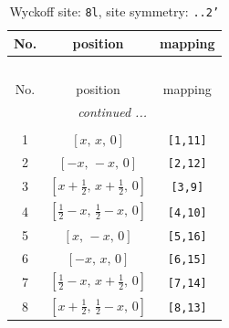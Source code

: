 \documentclass[fleqn,8pt]{jsarticle}
\begin{document}
\begin{longtable}{ccc}
\caption{Wyckoff site: {\tt 8l}, site symmetry: {\tt ..2'}}
 \\
 \hline \hline
No. & position & mapping \\ \hline \endfirsthead

\multicolumn{2}{l}{\tablename\ \thetable{}} \\
 \hline \hline
No. & position & mapping \\ \hline \endhead

 \hline \hline
\multicolumn{2}{r}{\footnotesize\it continued ...} \\ \endfoot

 \hline \hline
\multicolumn{2}{r}{} \\ \endlastfoot

1 & $\left[ x,\, x,\, 0 \right]$ & {\tt [1,11]} \\ \hline
2 & $\left[ - x,\, - x,\, 0 \right]$ & {\tt [2,12]} \\ \hline
3 & $\left[ x + \frac{1}{2},\, x + \frac{1}{2},\, 0 \right]$ & {\tt [3,9]} \\ \hline
4 & $\left[ \frac{1}{2} - x,\, \frac{1}{2} - x,\, 0 \right]$ & {\tt [4,10]} \\ \hline
5 & $\left[ x,\, - x,\, 0 \right]$ & {\tt [5,16]} \\ \hline
6 & $\left[ - x,\, x,\, 0 \right]$ & {\tt [6,15]} \\ \hline
7 & $\left[ \frac{1}{2} - x,\, x + \frac{1}{2},\, 0 \right]$ & {\tt [7,14]} \\ \hline
8 & $\left[ x + \frac{1}{2},\, \frac{1}{2} - x,\, 0 \right]$ & {\tt [8,13]} \\
\end{longtable}
\renewcommand{\arraystretch}{1.2}
\end{document}
